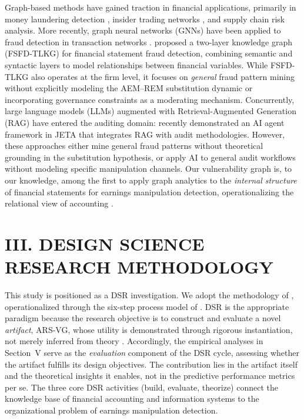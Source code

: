 \documentclass[12pt]{article}
\begin{document}
Graph-based methods have gained traction in financial applications, primarily
in money laundering detection \citep{savage2014}, insider trading networks
\citep{ahern2017}, and supply chain risk analysis.  More recently, graph neural
networks (GNNs) have been applied to fraud detection in transaction networks
\citep{liu2020,wang2019}.  \citet{caixie2024} proposed a two-layer knowledge graph (FSFD-TLKG) for
financial statement fraud detection, combining semantic and syntactic layers
to model relationships between financial variables.  While FSFD-TLKG also
operates at the firm level, it focuses on \emph{general} fraud pattern mining
without explicitly modeling the AEM--REM substitution dynamic or
incorporating governance constraints as a moderating mechanism.
Concurrently, large language models (LLMs) augmented with
Retrieval-Augmented Generation (RAG) have entered the auditing domain:
\citet{jetaaiagent2025} recently demonstrated an AI agent framework in JETA
that integrates RAG with audit methodologies.  However, these approaches
either mine general fraud patterns without theoretical grounding in the
substitution hypothesis, or apply AI to general audit workflows without
modeling specific manipulation channels.  Our vulnerability graph is,
to our knowledge, among the first to apply graph analytics to the
\emph{internal structure} of financial statements for earnings manipulation
detection, operationalizing the relational view of accounting
\citep{dechow2011}.

\section*{\centering III. DESIGN SCIENCE RESEARCH METHODOLOGY}
\label{sec:dsr}

This study is positioned as a DSR investigation.  We adopt the methodology
of \citet{hevner2004}, operationalized through the six-step process model of
\citet{peffers2007}.  DSR is the appropriate paradigm because the research
objective is to construct and evaluate a novel \emph{artifact}, ARS-VG, whose
utility is demonstrated through rigorous instantiation, not merely inferred
from theory \citep{march1995}.  Accordingly, the empirical analyses in
Section~V serve as the \emph{evaluation} component of the DSR cycle, assessing
whether the artifact fulfills its design objectives.  The contribution lies in
the artifact itself and the theoretical insights it enables, not in the
predictive performance metrics per se.  The three core DSR activities (build,
evaluate, theorize) connect the knowledge base of financial accounting and
information systems to the organizational problem of earnings manipulation
detection.
\end{document}
